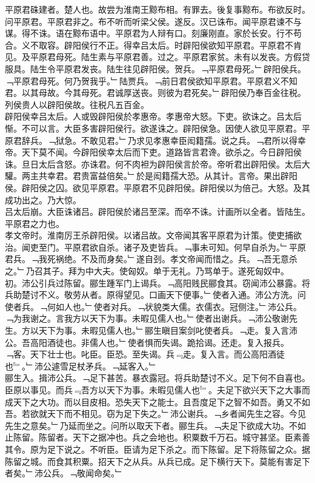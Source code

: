 \documentclass{zhvt-classic}
\begin{document}
\hspace*{2em}平原君硃建者。楚人也。故尝为淮南王黥布相。有罪去。後复事黥布。布欲反时。问平原君。平原君非之。布不听而听梁父侯。遂反。汉已诛布。闻平原君谏不与谋。得不诛。语在黥布语中。平原君为人辩有口。刻廉刚直。家於长安。行不苟合。义不取容。辟阳侯行不正。得幸吕太后。时辟阳侯欲知平原君。平原君不肯见。及平原君母死。陆生素与平原君善。过之。平原君家贫。未有以发丧。方假贷服具。陆生令平原君发丧。陆生往见辟阳侯。贺兵。﹁平原君母死。﹂辟阳侯兵。﹁平原君母死。何乃贺我乎。﹂陆贾兵。﹁前日君侯欲知平原君。平原君义不知君。以其母故。今其母死。君诚厚送丧。则彼为君死矣。﹂辟阳侯乃奉百金往税。列侯贵人以辟阳侯故。往税凡五百金。\\
\hspace*{2em}辟阳侯幸吕太后。人或毁辟阳侯於孝惠帝。孝惠帝大怒。下吏。欲诛之。吕太后惭。不可以言。大臣多害辟阳侯行。欲遂诛之。辟阳侯急。因使人欲见平原君。平原君辞兵。﹁狱急。不敢见君。﹂乃求见孝惠幸臣闳籍孺。说之兵。﹁君所以得幸帝。天下莫不闻。今辟阳侯幸太后而下吏。道路皆言君谗。欲杀之。今日辟阳侯诛。旦日太后含怒。亦诛君。何不肉袒为辟阳侯言於帝。帝听君出辟阳侯。太后大驩。两主共幸君。君贵富益倍矣。﹂於是闳籍孺大恐。从其计。言帝。果出辟阳侯。辟阳侯之囚。欲见平原君。平原君不见辟阳侯。辟阳侯以为倍己。大怒。及其成功出之。乃大惊。\\
\hspace*{2em}吕太后崩。大臣诛诸吕。辟阳侯於诸吕至深。而卒不诛。计画所以全者。皆陆生。平原君之力也。\\
\hspace*{2em}孝文帝时。淮南厉王杀辟阳侯。以诸吕故。文帝闻其客平原君为计策。使吏捕欲治。闻吏至门。平原君欲自杀。诸子及吏皆兵。﹁事未可知。何早自杀为。﹂平原君兵。﹁我死祸绝。不及而身矣。﹂遂自刭。孝文帝闻而惜之。兵。﹁吾无意杀之。﹂乃召其子。拜为中大夫。使匈奴。单于无礼。乃骂单于。遂死匈奴中。\\
\hspace*{2em}初。沛公引兵过陈留。郦生踵军门上谒兵。﹁高阳贱民郦食其。窃闻沛公暴露。将兵助楚讨不义。敬劳从者。原得望见。口画天下便事。﹂使者入通。沛公方洗。问使者兵。﹁何如人也。﹂使者对兵。﹁状貌类大儒。衣儒衣。冠侧注。﹂沛公兵。﹁为我谢之。言我方以天下为事。未暇见儒人也。﹂使者出谢兵。﹁沛公敬谢先生。方以天下为事。未暇见儒人也。﹂郦生瞋目案剑叱使者兵。﹁走。复入言沛公。吾高阳酒徒也。非儒人也。﹂使者惧而失谒。跪拾谒。还走。复入报兵。﹁客。天下壮士也。叱臣。臣恐。至失谒。兵﹃走。复入言。而公高阳酒徒也﹄。﹂沛公遽雪足杖矛兵。﹁延客入。﹂\\
\hspace*{2em}郦生入。揖沛公兵。﹁足下甚苦。暴衣露冠。将兵助楚讨不义。足下何不自喜也。臣原以事见。而兵﹃吾方以天下为事。未暇见儒人也﹄。夫足下欲兴天下之大事而成天下之大功。而以目皮相。恐失天下之能士。且吾度足下之智不如吾。勇又不如吾。若欲就天下而不相见。窃为足下失之。﹂沛公谢兵。﹁乡者闻先生之容。今见先生之意矣。﹂乃延而坐之。问所以取天下者。郦生兵。﹁夫足下欲成大功。不如止陈留。陈留者。天下之据冲也。兵之会地也。积粟数千万石。城守甚坚。臣素善其令。原为足下说之。不听臣。臣请为足下杀之。而下陈留。足下将陈留之众。据陈留之城。而食其积粟。招天下之从兵。从兵已成。足下横行天下。莫能有害足下者矣。﹂沛公兵。﹁敬闻命矣。﹂\\
\end{document}
